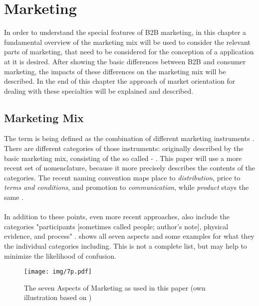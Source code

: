 \section{Marketing}
In order to understand the special features of B2B marketing, in this chapter a fundamental overview of the marketing mix will be used to consider the relevant parts of marketing, that need to be considered for the conception of a application at it is desired. After showing the basic differences between B2B and consumer marketing, the impacts of these differences on the marketing mix will be described. In the end of this chapter the approach of market orientation for dealing with these specialties will be explained and described.

\subsection{Marketing Mix}
The term  is being defined as the combination of different marketing instruments \parencite[cf.][285]{Thommen.2012}. There are  different categories of those instruments: originally described by \textcite[cf.][]{McCarthy.1993} the basic marketing mix, consisting of the so called  -  . This paper will use a more recent set of nomenclature, because it more precisely describes the contents of the categories. The recent naming convention maps place to \textit{distribution}, price to \textit{terms and conditions}, and promotion to \textit{communication}, while \textit{product} stays the same \parencites[285]{Thommen.2012}[cf.][397-720]{Meffert.2015}. 

\paragraph*{} In addition to these points, even more recent approaches, also include the categories "participants [sometimes called people; author's note], physical evidence, and process" \parencite[5]{Rafiq.1995}.  shows all seven aspects and some examples for what they the individual categories including. This is not a complete list, but may help to minimize the likelihood of confusion. 

\begin{figure}[H]
	\texttt{[image: img/7p.pdf]}
	\caption[Seven Aspects of Marketing]{The seven Aspects of Marketing as used in this paper (own illustration based on \protect\cites[285]{Thommen.2012}[397-720]{Meffert.2015}{Hoepner2015})}
	\label{fig:aspects}
\end{figure}

